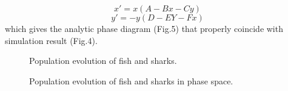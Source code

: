 \documentclass[aps,prl,preprint,superscriptaddress]{revtex4}
\begin{document}
\begin{equation}
x' = x(A - Bx - Cy)
\end{equation}
\begin{equation}
y' = -y(D - EY -Fx)
\end{equation}
which gives the analytic phase diagram (Fig.5) that properly coincide with simulation result (Fig.4).

\begin{figure}[H]
	\centering
	\caption{Population evolution of fish and sharks.}
	\label{more_clusters} 
\end{figure}


\begin{figure}[H]
	\centering
	\caption{Population evolution of fish and sharks in phase space.}
	\label{more_clusters} 
\end{figure}
\end{document}
